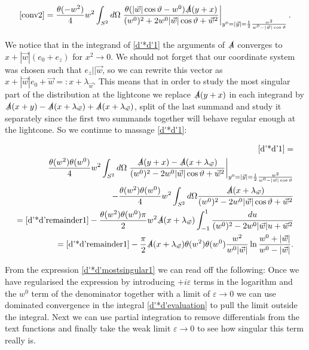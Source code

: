 \documentclass[a4paper,11pt]{article}
\begin{document}
\begin{align}\label{d'*d'2}
\eqref{conv2}= \frac{\theta(-w^2)}{4} w^2 \int_{S^2} d \Omega \left. \frac{\theta(|\vec{w}|\cos\vartheta - w^0) \slashed{A}(y+x)}{(w^0)^2 + 2 w^0 |\vec{w}| \cos\vartheta + \vec{w}^2}\right|_{y^0=|\vec{y}|=\frac{1}{2}\frac{w^2}{w^0-|\vec{w}|\cos\vartheta}}.
\end{align}

We notice that in the integrand of \eqref{d'*d'1} the arguments of \(\slashed{A}\) 
converges to \(x + |\vec{w}|(e_0+e_z)\) for \(x^2\rightarrow 0\). We should not forget that our coordinate 
system was chosen such that \(e_z|| \vec{w}\), so we can rewrite this vector as 
\(x+ |\vec{w}|e_0 + \vec{w}=:x+\lambda_{\vec{w}}\). 
This means that in order to study the 
most singular part of the distribution at the lightcone we replace \(\slashed{A}(y+x)\) in each integrand by
\(\slashed{A}(x+y)- \slashed{A}(x+\lambda_{\vec{w}}) + \slashed{A}(x+\lambda_{\vec{w}})\), 
split of the last summand and study it separately since the first two 
summands together will behave regular enough at the lightcone. So we continue to massage \eqref{d'*d'1}:

\begin{align}\nonumber
\eqref{d'*d'1}=\\\label{d'*d'remainder1}
 \frac{\theta(w^2) \theta(w^0)}{4} w^2 \int_{S^2} d \Omega \left.\frac{\slashed{A}(y+x)-\slashed{A}(x+\lambda_{\vec{w}})}{(w^0)^2 - 2 w^0 |\vec{w}| \cos\vartheta + \vec{w}^2}
\right|_{y^0=|\vec{y}|=\frac{1}{2}\frac{w^2}{w^0-|\vec{w}|\cos\vartheta}}\\
-\frac{\theta(w^2) \theta(w^0)}{4} w^2 \int_{S^2} d \Omega \frac{\slashed{A}(x+\lambda_{\vec{w}})}{(w^0)^2 - 2 w^0 |\vec{w}| \cos\vartheta + \vec{w}^2}\\
=\eqref{d'*d'remainder1} - \frac{\theta(w^2) \theta(w^0) \pi}{2} w^2 \slashed{A}(x+\lambda_{\vec{w}}) 
\int_{-1}^1 \frac{d u}{(w^0)^2 - 2 w^0 |\vec{w}| u + \vec{w}^2}\\\label{d'*d'mostsingular1}
=\eqref{d'*d'remainder1} -\frac{\pi}{2}\slashed{A}(x+\lambda_{\vec{w}}) 
\theta(w^2)\theta(w^0) \frac{w^2}{w^0 |\vec{w}|} \ln \frac{w^0+|\vec{w}|}{w^0-|\vec{w}|}.
\end{align}

From the expression \eqref{d'*d'mostsingular1} we can read off the following: Once we have regularised the expression 
by introducing \(+i \varepsilon\) terms in the logarithm and the \(w^0\) term of the denominator together with a limit of
\(\varepsilon \rightarrow 0\) we can use dominated convergence in the integral \eqref{d'*d'evaluation} to pull the limit
outside the integral. Next we can use partial integration to remove differentials from the text functions and 
finally take the weak limit \(\varepsilon\rightarrow 0\) to see how singular this term really is. 
\end{document}
